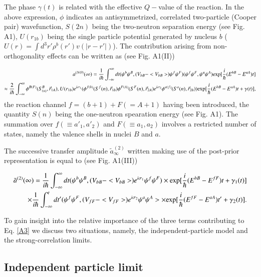 \documentclass[a4paper,14pt]{article}
\begin{document}
The phase $\gamma (t)$ is related  with the effective $Q-$value of the reaction. In the above expression, $\phi$ indicates an antisymmetrized, correlated two-particle (Cooper pair)  wavefunction, $S(2n)$ being the two-neutron separation energy (see Fig. A1), $U(r_{1b})$ being the single particle potential generated by nucleus $b$ ($U(r) = \int d^3 r' \rho^b(r') v(|r-r'|)$). The contribution arising from non-orthogonality effects can be written as (see Fig. A1(II))

\begin{eqnarray}
a^{(NO)} (\infty) = \frac{1}{i \hbar} \int^{\infty}_{-\infty} dt (\psi^b \psi^B, (V_{bB} - <V_{bB}>) \psi^f \psi^F )
(\psi^f\psi^F, \psi^a \psi^A) 
{\rm exp} [\frac{i}{\hbar} (E^{bB} - E^{aA}) t]  \nonumber  \\
\approx \frac{2}{i \hbar} \int^{\infty}_{- \infty} \phi^{B(F)} (S^B_{(n)}, \vec r_{1A}), U(r_{1b}) 
e^{i \sigma_1}
(\phi^{f(b)}(S^f(n), \vec r_{1b})  \phi^{F(A)} (S^F(n),\vec r_{2A}) e^{i \sigma_2} \phi^{a(f)}(S^a(n),\vec r_{2b})) 
{\rm exp} [\frac{i}{\hbar} (E^{bB} - E^{aA}) t + \gamma(t)] ,
\end{eqnarray}
the reaction channel $f= (b+1) + F(=A+1)$ having been introduced, the quantity $S(n)$ being the one-neutron spearation 
energy (see Fig. A1). The summation over $f(\equiv a'_1,a'_2)$ and $F (\equiv a_1,a_2)$ involves a restricted number of states, namely the valence shells in nuclei $B$ and $a$.

The successive transfer amplitude  $\tilde a^{(2)}_{\infty}$ written making use of the post-prior representation is equal to 
(see Fig. A1(III))

\begin{eqnarray}
\tilde a^{(2)} (\infty) = \frac{1}{i \hbar} \int^{\infty}_{-\infty} dt (\psi^b \psi^B, (V_{bB} - <V_{bB}>) e^{i \sigma_1} \psi^f \psi^F ) \times 
{\rm exp} [\frac{i}{\hbar} (E^{bB} - E^{fF}) t + \gamma_1(t)] \nonumber  \\
\times \frac{1}{i \hbar} \int^{t}_{-\infty} dt' (\psi^f \psi^F, (V_{fF} - <V_{fF}>) e^{i \sigma_2} \psi^a \psi^A > \times 
{\rm exp} [\frac{i}{\hbar} (E^{fF} - E^{aA}) t' + \gamma_2(t)].
\end{eqnarray}

To gain insight into the  relative importance of the three terms contributing to Eq. \ref{A3} we discuss two situations, namely,
the independent-particle model and the strong-correlation limits.

\subsection{Independent particle limit}
\end{document}
